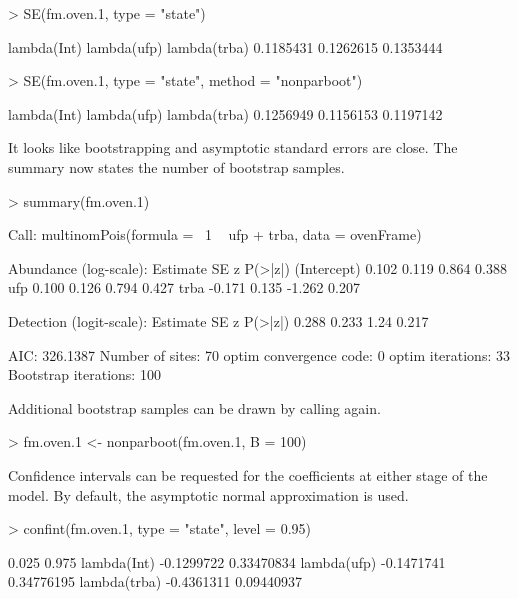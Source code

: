 \documentclass[article,shortnames]{jss}
\begin{document}
\begin{Schunk}
\begin{Sinput}
> SE(fm.oven.1, type = "state")
\end{Sinput}
\begin{Soutput}
 lambda(Int)  lambda(ufp) lambda(trba) 
   0.1185431    0.1262615    0.1353444 
\end{Soutput}
\begin{Sinput}
> SE(fm.oven.1, type = "state", method = "nonparboot")
\end{Sinput}
\begin{Soutput}
 lambda(Int)  lambda(ufp) lambda(trba) 
   0.1256949    0.1156153    0.1197142 
\end{Soutput}
\end{Schunk}

It looks like bootstrapping and asymptotic standard errors are close.
The summary now states the number of bootstrap samples.

\begin{Schunk}
\begin{Sinput}
> summary(fm.oven.1)
\end{Sinput}
\begin{Soutput}
Call:
multinomPois(formula = ~1 ~ ufp + trba, data = ovenFrame)

Abundance (log-scale):
            Estimate    SE      z P(>|z|)
(Intercept)    0.102 0.119  0.864   0.388
ufp            0.100 0.126  0.794   0.427
trba          -0.171 0.135 -1.262   0.207

Detection (logit-scale):
 Estimate    SE    z P(>|z|)
    0.288 0.233 1.24   0.217

AIC: 326.1387 
Number of sites: 70
optim convergence code: 0
optim iterations: 33 
Bootstrap iterations: 100 
\end{Soutput}
\end{Schunk}

Additional bootstrap samples can be drawn by calling  again.
\begin{Schunk}
\begin{Sinput}
> fm.oven.1 <- nonparboot(fm.oven.1, B = 100)
\end{Sinput}
\end{Schunk}

Confidence intervals can be requested for the coefficients at either
stage of the model.  By default, the asymptotic normal approximation
is used.

\begin{Schunk}
\begin{Sinput}
> confint(fm.oven.1, type = "state", level = 0.95)
\end{Sinput}
\begin{Soutput}
                  0.025      0.975
lambda(Int)  -0.1299722 0.33470834
lambda(ufp)  -0.1471741 0.34776195
lambda(trba) -0.4361311 0.09440937
\end{Soutput}
\end{Schunk}
\end{document}
